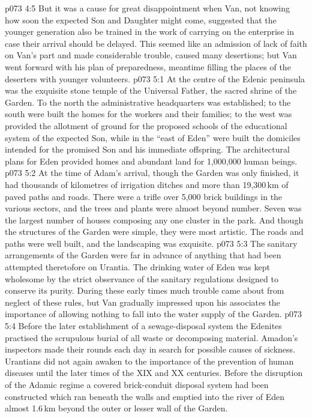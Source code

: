 \vs p073 4:5 But it was a cause for great disappointment when Van, not knowing how soon the expected Son and Daughter might come, suggested that the younger generation also be trained in the work of carrying on the enterprise in case their arrival should be delayed. This seemed like an admission of lack of faith on Van’s part and made considerable trouble, caused many desertions; but Van went forward with his plan of preparedness, meantime filling the places of the deserters with younger volunteers.
\vs p073 5:1 At the centre of the Edenic peninsula was the exquisite stone temple of the Universal Father, the sacred shrine of the Garden. To the north the administrative headquarters was established; to the south were built the homes for the workers and their families; to the west was provided the allotment of ground for the proposed schools of the educational system of the expected Son, while in the “east of Eden” were built the domiciles intended for the promised Son and his immediate offspring. The architectural plans for Eden provided homes and abundant land for 1,000,000 human beings.
\vs p073 5:2 At the time of Adam’s arrival, though the Garden was only  finished, it had thousands of kilometres of irrigation ditches and more than 19,300\,km of paved paths and roads. There were a trifle over 5,000 brick buildings in the various sectors, and the trees and plants were almost beyond number. Seven was the largest number of houses composing any one cluster in the park. And though the structures of the Garden were simple, they were most artistic. The roads and paths were well built, and the landscaping was exquisite.
\vs p073 5:3 The sanitary arrangements of the Garden were far in advance of anything that had been attempted theretofore on Urantia. The drinking water of Eden was kept wholesome by the strict observance of the sanitary regulations designed to conserve its purity. During these early times much trouble came about from neglect of these rules, but Van gradually impressed upon his associates the importance of allowing nothing to fall into the water supply of the Garden.
\vs p073 5:4 Before the later establishment of a sewage\hyp{}disposal system the Edenites practised the scrupulous burial of all waste or decomposing material. Amadon’s inspectors made their rounds each day in search for possible causes of sickness. Urantians did not again awaken to the importance of the prevention of human diseases until the later times of the XIX and XX centuries. Before the disruption of the Adamic regime a covered brick\hyp{}conduit disposal system had been constructed which ran beneath the walls and emptied into the river of Eden almost 1.6\,km beyond the outer or lesser wall of the Garden.

